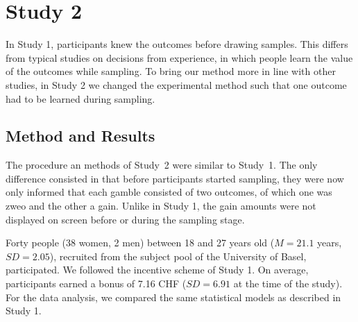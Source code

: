 \documentclass[a4paper, man, natbib, floatsintext]{apa6} %
\begin{document}
\section{Study 2}
In Study 1, participants knew the outcomes before drawing samples. This differs from typical studies on decisions from experience, in which people learn the value of the outcomes while sampling. To bring our method more in line with other studies, in Study 2 we changed the experimental method such that one outcome had to be learned during sampling.

\subsection{Method and Results}
The procedure an methods of Study~2 were similar to Study~1. The only difference consisted in that before participants started sampling, they were now only informed that each gamble consisted of two outcomes, of which one was zweo and the other a gain. Unlike in Study 1, the gain amounts were not displayed on screen before or during the sampling stage.

Forty people (38 women, 2 men) between 18 and 27 years old ($M = 21.1$ years, $SD = 2.05$), recruited from the subject pool of the University of Basel, participated. We followed the incentive scheme of Study 1. On average, participants earned a bonus of 7.16 CHF ($SD = 6.91$ at the time of the study). For the data analysis, we compared the same statistical models as described in Study 1.
\end{document}
